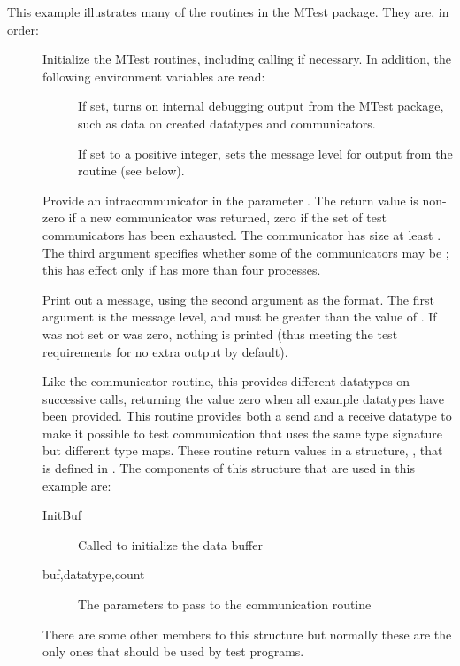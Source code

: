 This example illustrates many of the routines in the MTest package.
They are, in order:
\begin{description}
\item[]Initialize the MTest routines, including
calling  if necessary.  In addition, the following
environment variables are read:
\begin{description}
\item[]If set, turns on internal debugging output
from the MTest package, such as data on created datatypes and communicators.
\item[]If set to a positive integer, sets the
message level for output from the routine  (see
below).
\end{description}

\item[]Provide an intracommunicator in
the parameter .  The return value is non-zero if a new
communicator was returned, zero if the set of test communicators has
been exhausted.  The communicator has size at least .
The third argument specifies whether some of the communicators may be
; this has effect only if 
has more than four processes.
\item[]Print out a message, using the second
argument as the  format.  The first argument is the
message level, and must be greater than the value of
.  If  was not set or was
zero, nothing is printed (thus meeting the test requirements for no
extra output by default).

\item[]Like the communicator routine, this
provides different datatypes on successive calls, returning the value
zero when all example datatypes have been provided.  This routine
provides both a send and a receive datatype to make it possible to
test communication that uses the same type signature but different
type maps.  These routine return values in a structure,
, that is defined in .  The
components of this structure that are used in this example are:

    \begin{description}
    \item[InitBuf]Called to initialize the data buffer
    \item[buf,datatype,count]The parameters to pass to the
    communication routine
    \end{description}
There are some other members to this structure but normally these are
the only ones that should be used by test programs.


\end{description}

